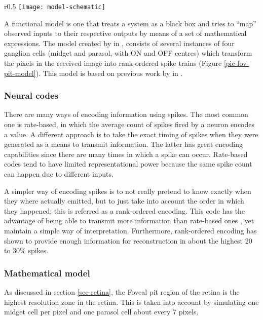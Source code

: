 \begin{wrapfigure}{r}{0.5\textwidth}
    \vspace{-20pt}
    \centering
    \texttt{[image: model-schematic]}
    \caption{Schematic of the foveal pit model}
    \label{pic-fov-pit-model}
\end{wrapfigure}

A functional model is one that treats a system as a black box
and tries to ``map'' observed inputs to their respective outputs 
by means of a set of mathematical expressions. The model created
by \citeauthor{basab-model} in \cite{basab-thesis, basab-model},
consists of several instances of four ganglion cells (midget and 
parasol, with ON and OFF centres) which transform the pixels in 
the received image into rank-ordered spike trains (Figure 
\ref{pic-fov-pit-model}). This model is based on previous work 
by \citeauthor{van-rullen-rate-coding} in
\cite{van-rullen-rate-coding}.


\subsubsection{Neural codes} There are many ways of encoding 
information using spikes. The most common one is rate-based, in 
which the average count of spikes fired by a neuron encodes a value. 
A different approach is to take the exact timing of spikes when 
they were generated as a means to transmit information. The latter 
has great encoding capabilities since there are many times in which 
a spike can occur. Rate-based codes tend to have limited 
representational power because the same spike count can happen due
to different inputs.

A simpler way of encoding spikes is to not really pretend to know 
exactly when they where actually emitted, but to just take into 
account the order in which they happened; this is referred as a 
rank-ordered encoding. This code has the advantage of being able 
to transmit more information than rate-based ones 
\cite{basab-thesis,thorpe-spike-rapid-processing, thorpe-rate-coding-theory}, 
yet maintain a simple way of interpretation. Furthermore, rank-ordered
encoding has shown to provide enough information for reconstruction
in about the highest 20 to 30\% spikes.


\subsubsection{Mathematical model} As discussed in section \ref{sec-retina},
the Foveal pit region of the retina is the highest resolution 
zone in the retina. This is taken into account by simulating one 
midget cell per pixel and one parasol cell about every 7 pixels.

